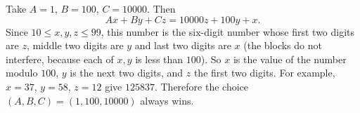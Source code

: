 Take $A=1$, $B=100$, $C=10000$. Then
\[
Ax+By+Cz=10000z+100y+x .
\]
Since $10\le x,y,z\le99$, this number is the six-digit number whose first two digits are $z$, middle two digits are $y$ and last two digits are $x$ (the blocks do not interfere, because each of $x,y$ is less than $100$). So $x$ is the value of the number modulo $100$, $y$ is the next two digits, and $z$ the first two digits. For example, $x=37$, $y=58$, $z=12$ give $125837$. Therefore the choice $\boxed{(A,B,C)=(1,100,10000)}$ always wins.
